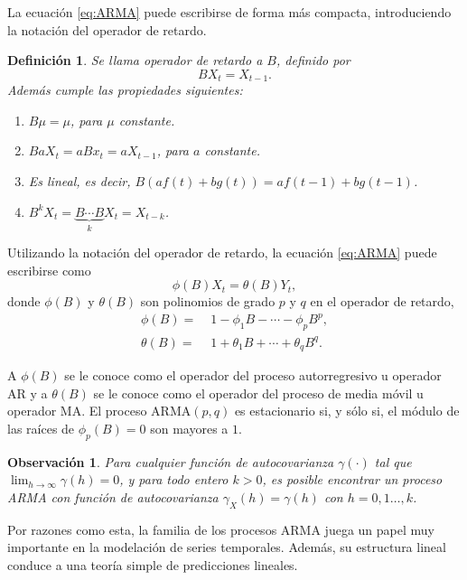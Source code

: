 \documentclass[12pt,twoside]{article}
\newtheorem{definition}[theorem]{Definición}
\newtheorem{remark}[theorem]{Observación}
\newcommand{\arma}{\text{ARMA}}
\begin{document}
La ecuación \eqref{eq:ARMA} puede escribirse de forma más compacta, introduciendo la notación del operador de retardo.

\begin{definition}\label{def:lag_operator}
    Se llama operador de retardo a $B$, definido por  
    \begin{equation}\label{eq:lag_operator}
    BX_t = X_{t-1}.
\end{equation}
Además cumple las propiedades siguientes:
\begin{enumerate}
    \item $B\mu = \mu$, para $\mu$ constante.
    \item $B a X_t = a B x_t = aX_{t-1}$, para $a$ constante.
    \item Es lineal, es decir, $B(af(t) + bg(t)) = af(t-1) + b g(t-1)$.
    \item $B^kX_t = \underbrace{B\cdots B}_k X_t = X_{t-k}$.
\end{enumerate}
\end{definition}

Utilizando la notación del operador de retardo, la ecuación \eqref{eq:ARMA} puede escribirse como
\begin{equation}\label{eq:ARMA_lag_op}
    \phi(B)X_t = \theta(B)Y_t,
\end{equation}
donde $\phi(B)$ y $\theta(B)$ son polinomios de grado $p$ y $q$ en el operador de retardo,
\begin{align}
    \phi(B) =& \;1 - \phi_1 B - \dotsb - \phi_p B^p \label{eq:ar_lag_op}, \\
    \theta(B) =&\; 1 +\theta_1 B + \dotsb + \theta_q B^q \label{eq:ma_lag_op}.
\end{align}

A $\phi(B)$ se le conoce como el operador del proceso autorregresivo u operador AR y a $\theta(B)$ se le conoce como el operador del proceso de media móvil u operador MA. El proceso $\arma(p,q)$ es estacionario si, y sólo si, el módulo de las raíces de $\phi_p(B) = 0$ son mayores a $1$.

\begin{remark}
Para cualquier función de autocovarianza $\gamma(\cdot)$ tal que $\lim_{h\rightarrow\infty} \gamma(h) = 0$, y para todo entero $k>0$, es posible encontrar un proceso ARMA con función de autocovarianza $\gamma_X(h) = \gamma(h)$ con $h=0,1\dotsc,k$. 
\end{remark}
Por razones como esta, la familia de los procesos ARMA juega un papel muy importante en la modelación de series temporales. Además, su estructura lineal conduce a una teoría simple de predicciones lineales.
\end{document}
